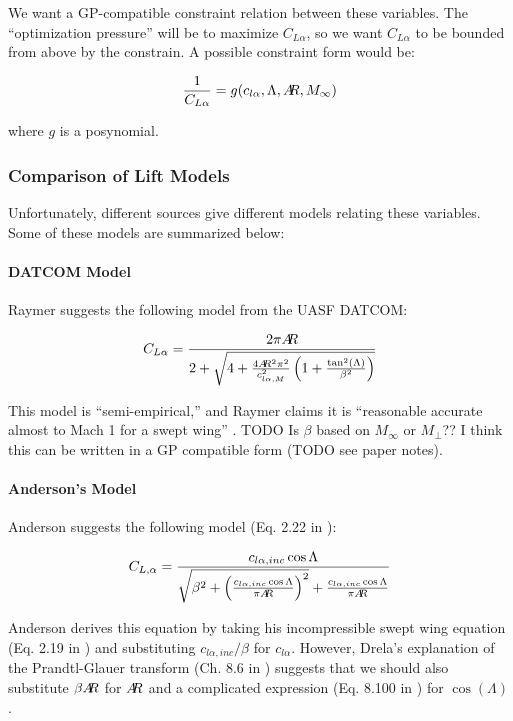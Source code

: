 \documentclass[12pt]{article}
\newcommand{\ar}{A\mkern-6mu R}
\begin{document}
We want a GP-compatible constraint relation between these variables. The ``optimization pressure'' will be to maximize $C_{L\alpha}$, so we want $C_{L\alpha}$ to be bounded from above by the constrain. A possible constraint form would be:

\begin{equation}
\frac{1}{C_{L\alpha}} = g(c_{l\alpha}, \Lambda, \ar, M_\infty)
\end{equation}

where $g$ is a posynomial.

\subsubsection{Comparison of Lift Models}

Unfortunately, different sources give different models relating these variables. Some of these models are summarized below:

\paragraph{DATCOM Model}
Raymer \cite{Raymer2012} suggests the following model from the UASF DATCOM:

\begin{equation}
C_{L\alpha} = \frac{2 \pi \ar}{2 + \sqrt{4 + \frac{4 \ar^2 \pi^2}{c_{l\alpha, M}^2} \left( 1 + \frac{\tan^2(\Lambda)}{\beta^2} \right)}}
\end{equation}

This model is ``semi-empirical,'' and Raymer claims it is ``reasonable accurate almost to Mach 1 for a swept wing'' \cite{Raymer2012}. 
TODO Is $\beta$ based on $M_\infty$ or $M_\perp$??
I think this can be written in a GP compatible form (TODO see paper notes).

\paragraph{Anderson's Model}
Anderson suggests the following model (Eq. 2.22 in \cite{Anderson1999}):

\begin{equation}
C_{L,\alpha} = \frac{c_{l\alpha, inc} \cos\Lambda}{
\sqrt{\beta^2 + \left( \frac{c_{l\alpha, inc} \cos\Lambda}{\pi \ar} \right)^2}
+ \frac{c_{l\alpha, inc} \cos\Lambda}{\pi \ar}}
\end{equation}

Anderson derives this equation by taking his incompressible swept wing equation (Eq. 2.19 in \cite{Anderson1999}) and substituting $c_{l\alpha, inc}/\beta$ for $c_{l\alpha}$. However, Drela's explanation of the Prandtl-Glauer transform (Ch. 8.6 in \cite{Drela2014}) suggests that we should also substitute $\beta \ar$ for $\ar$ and a complicated expression (Eq. 8.100 in \cite{Drela2014}) for $\cos(\Lambda)$.
\end{document}
